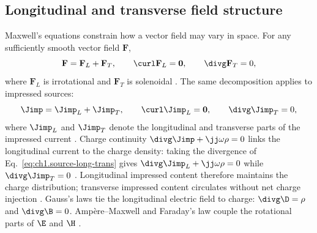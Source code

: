 \subsection{Longitudinal and transverse field structure}
\label{sec:ch01.1.1b}

Maxwell's equations constrain how a vector field may vary in space. For any sufficiently smooth vector field $\mathbf{F}$,
\begin{equation}
\label{eq:ch1.helmholtz-decomposition}
\mathbf{F}=\mathbf{F}_L+\mathbf{F}_T,
\qquad
\curl\mathbf{F}_L=\mathbf{0},
\qquad
\divg\mathbf{F}_T=0,
\end{equation}
where $\mathbf{F}_L$ is irrotational and $\mathbf{F}_T$ is solenoidal \cite{stratton1941,jackson1999}. The same decomposition applies to impressed sources:
\begin{equation}
\label{eq:ch1.source-long-trans}
\Jimp=\Jimp_L+\Jimp_T,
\qquad
\curl\Jimp_L=\mathbf{0},
\qquad
\divg\Jimp_T=0,
\end{equation}
where $\Jimp_L$ and $\Jimp_T$ denote the longitudinal and transverse parts of the impressed current \cite{stratton1941}. Charge continuity $\divg\Jimp+\jj\omega\rho=0$ links the longitudinal current to the charge density: taking the divergence of Eq.~\eqref{eq:ch1.source-long-trans} gives $\divg\Jimp_L+\jj\omega\rho=0$ while $\divg\Jimp_T=0$ \cite{maxwell1873}. Longitudinal impressed content therefore maintains the charge distribution; transverse impressed content circulates without net charge injection \cite{stratton1941}. Gauss's laws tie the longitudinal electric field to charge: $\divg\D=\rho$ and $\divg\B=0$. Amp\`ere--Maxwell and Faraday's law couple the rotational parts of $\E$ and $\H$ \cite{maxwell1873}.

